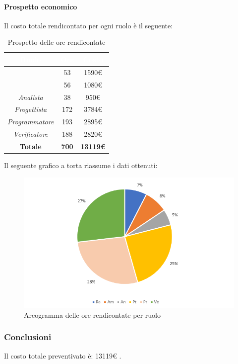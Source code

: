 \paragraph{Prospetto economico}
Il costo totale rendicontato per ogni ruolo è il seguente:
\begin{table}[H]
	\begin{center}
		\begin{tabular}{ |c c c| }
		\rowcolor{darkblue} 
		\textcolor{white}{\textbf{Ruolo}} & \textcolor{white}{\textbf{Ore}} & \textcolor{white}{\textbf{Costo}} \\ \hline
		\textit{\Responsabile} 		& 53 	& 1590€ \\ \hline
		\textit{\Amministratore}	& 56 	& 1080€ \\ \hline
		\textit{Analista} 			& 38 	& 950€ \\ \hline
		\textit{Progettista} 		& 172 	& 3784€ \\ \hline
		\textit{Programmatore} 		& 193 	& 2895€ \\ \hline
		\textit{Verificatore} 		& 188 	& 2820€ \\ \hline
		\textbf{Totale} & \textbf{700} & \textbf{13119€} \\ \hline
		\end{tabular}
	\caption{Prospetto delle ore rendicontate}
	\end{center}
\end{table}
Il seguente grafico a torta riassume i dati ottenuti:
\begin{figure}[H]
    \centering
    \includegraphics[scale = 0.75]{Immagini/TotaleRendicontatoTorta.png}
    \caption{Areogramma delle ore rendicontate per ruolo}
    \label{fig:Areogramma ripartizione ore totali rendicontate}
\end{figure}
\subsubsection{Conclusioni}
Il costo totale preventivato è: 13119€ .

